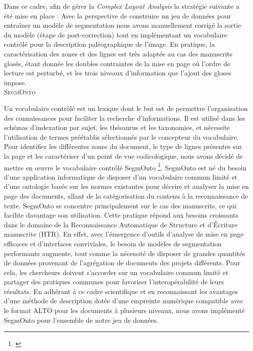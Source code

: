 \documentclass[a4paper, twoside, 12pt]{book}
\begin{document}
Dans ce cadre, afin de gérer la \textit{Complex Layout Analysis} la stratégie suivante a été mise en place : Avec la perspective de construire un jeu de données pour entraîner un modèle de segmentation nous avons manuellement corrigé la sortie du modèle (étape de post-correction) tout en implémentant un vocabulaire contrôlé pour la description paléographique de l'image. En pratique, la caractérisation des zones et des lignes est très adaptée au cas des manuscrits glosés, étant donnée les doubles contraintes de la mise en page où l'ordre de lecture est perturbé, et les trois niveaux d'information que l'ajout des gloses impose.\\ 

\textsc{SegmOnto}

Un vocabulaire contrôlé est un lexique dont le but est de permettre l'organisation des connaissances pour faciliter la recherche d'informations. Il est utilisé dans les schémas d'indexation par sujet, les thésaurus et les taxonomies, et nécessite l'utilisation de termes préétablis sélectionnés par le concepteur du vocabulaire. Pour identifier les différentes zones du document, le type de lignes présentes sur la page et les caractériser d'un point de vue codicologique, nous avons décidé de mettre en œuvre le vocabulaire contrôlé SegmOnto \footnote{\cite{gabay2021segmonto}}. SegmOnto est né du besoin d'une application informatique de disposer d'un vocabulaire commun limité et d'une ontologie basée sur les normes existantes pour décrire et analyser la mise en page des documents, allant de la catégorisation du contenu à la reconnaissance de texte. SegmOnto se concentre principalement sur le cas des manuscrits, ce qui facilite davantage son utilisation. Cette pratique répond aux besoins croissants dans le domaine de la Reconnaissance Automatique de Structure et d'Écriture manuscrite (HTR). En effet, avec l'émergence d'outils d'analyse de mise en page efficaces et d'interfaces conviviales, le besoin de modèles de segmentation performants augmente, tout comme la nécessité de disposer de grandes quantités de données provenant de l'agrégation de documents des projets différents. Pour cela, les chercheurs doivent s'accorder sur un vocabulaire commun limité et partager des pratiques communes pour favoriser l'interopérabilité de leurs résultats. En adhérant à ce cadre scientifique et en reconnaissant les avantages d'une méthode de description dotée d'une empreinte numérique compatible avec le format ALTO pour les documents à plusieurs niveaux, nous avons implémenté SegmOnto pour l'ensemble de notre jeu de données.\\
\end{document}
